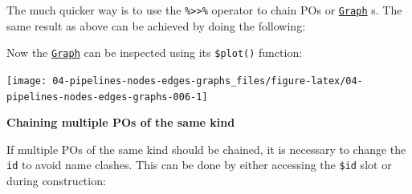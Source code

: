 \documentclass[]{scrbook}
\newenvironment{Shaded}{\begin{snugshade}}{\end{snugshade}}
\newcommand{\DataTypeTok}[1]{\textcolor[rgb]{0.13,0.29,0.53}{#1}}
\newcommand{\KeywordTok}[1]{\textcolor[rgb]{0.13,0.29,0.53}{\textbf{#1}}}
\newcommand{\NormalTok}[1]{#1}
\newcommand{\OperatorTok}[1]{\textcolor[rgb]{0.81,0.36,0.00}{\textbf{#1}}}
\newcommand{\StringTok}[1]{\textcolor[rgb]{0.31,0.60,0.02}{#1}}
\renewenvironment{Shaded} {\begin{snugshade}\small} {\end{snugshade}}
\begin{document}
The much quicker way is to use the \texttt{\%\textgreater{}\textgreater{}\%} operator to chain POs or \href{https://mlr3pipelines.mlr-org.com/reference/Graph.html}{\texttt{Graph}} s.
The same result as above can be achieved by doing the following:

\begin{Shaded}
\end{Shaded}

Now the \href{https://mlr3pipelines.mlr-org.com/reference/Graph.html}{\texttt{Graph}} can be inspected using its \texttt{\$plot()} function:

\begin{Shaded}
\end{Shaded}

\begin{center}\texttt{[image: 04-pipelines-nodes-edges-graphs\_files/figure-latex/04-pipelines-nodes-edges-graphs-006-1]} \end{center}

\textbf{Chaining multiple POs of the same kind}

If multiple POs of the same kind should be chained, it is necessary to change the \texttt{id} to avoid name clashes.
This can be done by either accessing the \texttt{\$id} slot or during construction:

\begin{Shaded}
\end{Shaded}

\begin{Shaded}
\end{Shaded}
\end{document}
